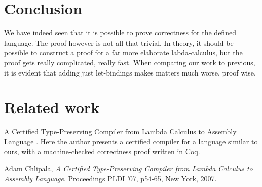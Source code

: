 \documentclass[paper=a4, fontsize=11pt]{scrartcl} %
\numberwithin{equation}{section} %
\numberwithin{figure}{section} %
\numberwithin{table}{section} %
\begin{document}
\section{Conclusion}
We have indeed seen that it is possible to prove correctness for the defined language. The proof however is not all that trivial. In theory, it should be possible to construct a proof for a far more elaborate labda-calculus, but the proof gets really complicated, really fast. When comparing our work to previous, it is evident that adding just let-bindings makes matters much worse, proof wise.
\section{Related work} %
A Certified Type-Preserving Compiler from Lambda Calculus to
Assembly Language \cite{Chlipala}. Here the author presents a certified compiler for a language similar to ours, with a machine-checked correctness proof written in Coq.

\begin{thebibliography}{9}
	Adam Chlipala,
  	\emph{A Certified Type-Preserving Compiler from Lambda Calculus to
Assembly Language}.
  	Proceedings PLDI '07, p54-65, New York, 2007.
	
\end{thebibliography}
\end{document}
